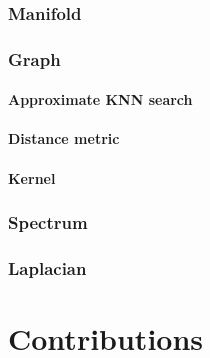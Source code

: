\documentclass[a4paper,12pt,twoside]{report}
\begin{document}
\section{Manifold}

\section{Graph}

\subsection{Approximate KNN search}

\subsection{Distance metric}

\subsection{Kernel}

\section{Spectrum}

\section{Laplacian}

\part{Contributions}
\label{contributions}
\end{document}
